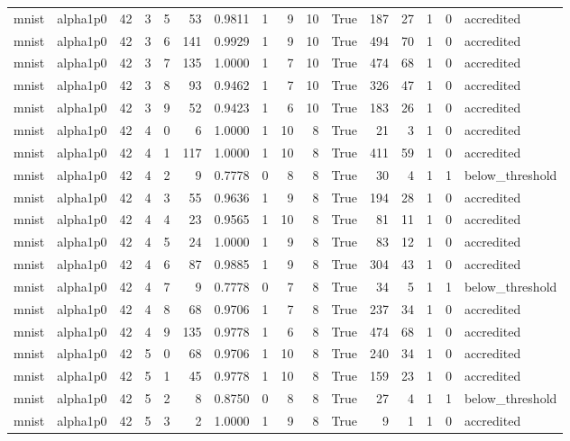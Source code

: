 \begin{tabular}{llrrrrrrrrrrrrrl}
mnist & alpha1p0 & 42 & 3 & 5 & 53 & 0.9811 & 1 & 9 & 10 & True & 187 & 27 & 1 & 0 & accredited \\
mnist & alpha1p0 & 42 & 3 & 6 & 141 & 0.9929 & 1 & 9 & 10 & True & 494 & 70 & 1 & 0 & accredited \\
mnist & alpha1p0 & 42 & 3 & 7 & 135 & 1.0000 & 1 & 7 & 10 & True & 474 & 68 & 1 & 0 & accredited \\
mnist & alpha1p0 & 42 & 3 & 8 & 93 & 0.9462 & 1 & 7 & 10 & True & 326 & 47 & 1 & 0 & accredited \\
mnist & alpha1p0 & 42 & 3 & 9 & 52 & 0.9423 & 1 & 6 & 10 & True & 183 & 26 & 1 & 0 & accredited \\
mnist & alpha1p0 & 42 & 4 & 0 & 6 & 1.0000 & 1 & 10 & 8 & True & 21 & 3 & 1 & 0 & accredited \\
mnist & alpha1p0 & 42 & 4 & 1 & 117 & 1.0000 & 1 & 10 & 8 & True & 411 & 59 & 1 & 0 & accredited \\
mnist & alpha1p0 & 42 & 4 & 2 & 9 & 0.7778 & 0 & 8 & 8 & True & 30 & 4 & 1 & 1 & below\_threshold \\
mnist & alpha1p0 & 42 & 4 & 3 & 55 & 0.9636 & 1 & 9 & 8 & True & 194 & 28 & 1 & 0 & accredited \\
mnist & alpha1p0 & 42 & 4 & 4 & 23 & 0.9565 & 1 & 10 & 8 & True & 81 & 11 & 1 & 0 & accredited \\
mnist & alpha1p0 & 42 & 4 & 5 & 24 & 1.0000 & 1 & 9 & 8 & True & 83 & 12 & 1 & 0 & accredited \\
mnist & alpha1p0 & 42 & 4 & 6 & 87 & 0.9885 & 1 & 9 & 8 & True & 304 & 43 & 1 & 0 & accredited \\
mnist & alpha1p0 & 42 & 4 & 7 & 9 & 0.7778 & 0 & 7 & 8 & True & 34 & 5 & 1 & 1 & below\_threshold \\
mnist & alpha1p0 & 42 & 4 & 8 & 68 & 0.9706 & 1 & 7 & 8 & True & 237 & 34 & 1 & 0 & accredited \\
mnist & alpha1p0 & 42 & 4 & 9 & 135 & 0.9778 & 1 & 6 & 8 & True & 474 & 68 & 1 & 0 & accredited \\
mnist & alpha1p0 & 42 & 5 & 0 & 68 & 0.9706 & 1 & 10 & 8 & True & 240 & 34 & 1 & 0 & accredited \\
mnist & alpha1p0 & 42 & 5 & 1 & 45 & 0.9778 & 1 & 10 & 8 & True & 159 & 23 & 1 & 0 & accredited \\
mnist & alpha1p0 & 42 & 5 & 2 & 8 & 0.8750 & 0 & 8 & 8 & True & 27 & 4 & 1 & 1 & below\_threshold \\
mnist & alpha1p0 & 42 & 5 & 3 & 2 & 1.0000 & 1 & 9 & 8 & True & 9 & 1 & 1 & 0 & accredited \\

\end{tabular}
